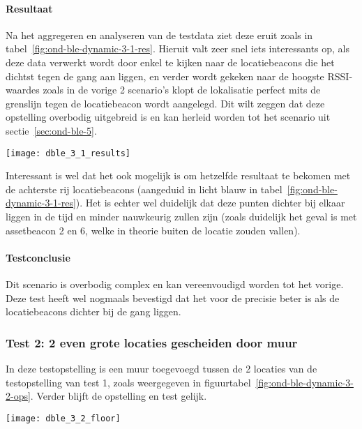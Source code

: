 \paragraph{Resultaat}
\begin{minipage}{0.42\textwidth}
Na het aggregeren en analyseren van de testdata ziet deze eruit zoals in tabel~\ref{fig:ond-ble-dynamic-3-1-res}. Hieruit valt zeer snel iets interessants op, als deze data verwerkt wordt door enkel te kijken naar de locatiebeacons die het dichtst tegen de gang aan liggen, en verder wordt gekeken naar de hoogste RSSI-waardes zoals in de vorige 2 scenario's klopt de lokalisatie perfect mits de grenslijn tegen de locatiebeacon wordt aangelegd. Dit wilt zeggen dat deze opstelling overbodig uitgebreid is en kan herleid worden tot het scenario uit sectie~\ref{sec:ond-ble-5}. 
\end{minipage}
\hfill
\begin{minipage}{0.55\textwidth}
	\texttt{[image: dble\_3\_1\_results]}
	\label{fig:ond-ble-dynamic-3-1-res}
\end{minipage}

Interessant is wel dat het ook mogelijk is om hetzelfde resultaat te bekomen met de achterste rij locatiebeacons (aangeduid in licht blauw in tabel~\ref{fig:ond-ble-dynamic-3-1-res}). Het is echter wel duidelijk dat deze punten dichter bij elkaar liggen in de tijd en minder nauwkeurig zullen zijn (zoals duidelijk het geval is met assetbeacon 2 en 6, welke in theorie buiten de locatie zouden vallen).

\paragraph{Testconclusie}
Dit scenario is overbodig complex en kan vereenvoudigd worden tot het vorige. Deze test heeft wel nogmaals bevestigd dat het voor de precisie beter is als de locatiebeacons dichter bij de gang liggen.

\subsubsection{Test 2: 2 even grote locaties gescheiden door muur}
\label{sec:ond-ble-6-2}
\begin{minipage}{0.55\textwidth}
In deze testopstelling is een muur toegevoegd tussen de 2 locaties van de testopstelling van test 1, zoals weergegeven in figuurtabel~\ref{fig:ond-ble-dynamic-3-2-ops}. Verder blijft de opstelling en test gelijk.
\end{minipage}
\hfill
\begin{minipage}{0.42\textwidth}
	\texttt{[image: dble\_3\_2\_floor]}
	\label{fig:ond-ble-dynamic-3-2-ops}
\end{minipage}

